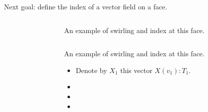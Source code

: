 \begin{frame}
Next goal: define the index of a vector field on a face.
\end{frame}

\begin{frame}
\begin{columns}
\begin{column}{0.65\textwidth}
\vspace{12pt}
\begingroup
{}

\endgroup
\end{column}
\begin{column}{0.35\textwidth}
An example of \alert{swirling} and \alert{index} at this face.
\end{column}
\end{columns}
\end{frame}

\begin{frame}
\begin{columns}
\begin{column}{0.65\textwidth}
\vspace{12pt}
\begingroup
{}

\endgroup
\end{column}
\begin{column}{0.35\textwidth}
An example of \alert{swirling} and \alert{index} at this face.
\begin{itemize}
\item<1-> Denote by \( X_1 \) this vector \( X(v_1):T_1 \).
\item<1-> 
\item<1-> 
\item<1-> 
\end{itemize}
\end{column}
\end{columns}
\end{frame}

